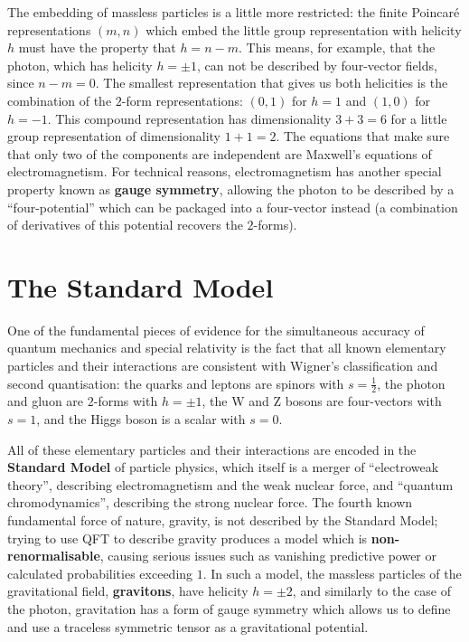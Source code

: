 \documentclass[12pt]{article}
\begin{document}
The embedding of massless particles is a little more restricted: the finite Poincaré representations $\left(m,n\right)$ which embed the little group representation with helicity $h$ must have the property that $h = n - m$. This means, for example, that the photon, which has helicity $h = \pm 1$, can not be described by four-vector fields, since $n - m = 0$. The smallest representation that gives us both helicities is the combination of the $2$-form representations: $\left(0,1\right)$ for $h=1$ and $\left(1,0\right)$ for $h=-1$. This compound representation  has dimensionality $3+3=6$ for a little group representation of dimensionality $1+1=2$. The equations that make sure that only two of the components are independent are Maxwell's equations of electromagnetism. For technical reasons, electromagnetism has another special property known as \textbf{gauge symmetry}, allowing the photon to be described by a ``four-potential'' which can be packaged into a four-vector instead (a combination of derivatives of this potential recovers the $2$-forms).

\section{The Standard Model}

One of the fundamental pieces of evidence for the simultaneous accuracy of quantum mechanics and special relativity is the fact that all known elementary particles and their interactions are consistent with Wigner's classification and second quantisation: the quarks and leptons are spinors with $s=\tfrac{1}{2}$, the photon and gluon are $2$-forms with $h = \pm 1$, the W and Z bosons are four-vectors with $s=1$, and the Higgs boson is a scalar with $s=0$.
\newline

All of these elementary particles and their interactions are encoded in the \textbf{Standard Model} of particle physics, which itself is a merger of ``electroweak theory'', describing electromagnetism and the weak nuclear force, and ``quantum chromodynamics'', describing the strong nuclear force. The fourth known fundamental force of nature, gravity, is not described by the Standard Model; trying to use QFT to describe gravity produces a model which is \textbf{non-renormalisable}, causing serious issues such as vanishing predictive power or calculated probabilities exceeding $1$. In such a model, the massless particles of the gravitational field, \textbf{gravitons}, have helicity $h = \pm 2$, and similarly to the case of the photon, gravitation has a form of gauge symmetry which allows us to define and use a traceless symmetric tensor as a gravitational potential.
\newline
\end{document}
